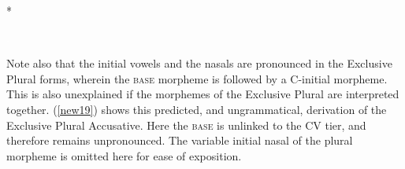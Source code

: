 \documentclass[output=paper,colorlinks,citecolor=brown,
]{langscibook}
\begin{document}
\begin{multicols}{3}
\begin{exe}
\ex \label{new18} *

\vfill \null
\columnbreak
 {\textcolor{white}{.}} \\
\rightarrow 
 
\vfill \null
\columnbreak


\end{exe}
\end{multicols}

Note also that the initial vowels and the nasals are pronounced in the Exclusive Plural forms, wherein the \textsc{base} morpheme is followed by a C-initial morpheme. This is also unexplained if the morphemes of the Exclusive Plural are interpreted together. (\ref{new19}) shows this predicted, and ungrammatical, derivation of the Exclusive Plural Accusative. Here the \textsc{base} is unlinked to the CV tier, and therefore remains unpronounced. The variable initial nasal of the plural morpheme is omitted here for ease of exposition.
\end{document}
